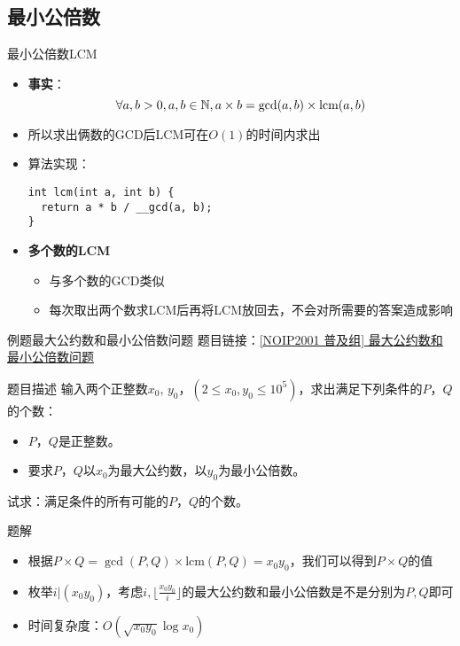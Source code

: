 \subsection{最小公倍数}
\begin{frame}[fragile]{最小公倍数}{LCM}
  \begin{itemize}
    \item \textbf{事实}：
    $$\forall a,b>0,a,b\in \mathbb{N}, a\times b=\gcd(a,b)\times \text{lcm}(a,b)$$
    \item 所以求出俩数的GCD后LCM可在$O(1)$的时间内求出
    \pause
    \item 算法实现：
    \begin{lstlisting}
int lcm(int a, int b) {
  return a * b / __gcd(a, b);
}
    \end{lstlisting}
    \pause
    \item \textbf{多个数的LCM}
    \begin{itemize}
      \item 与多个数的GCD类似
      \pause
      \item 每次取出两个数求LCM后再将LCM放回去，不会对所需要的答案造成影响
    \end{itemize}
  \end{itemize}
\end{frame}

\begin{frame}{例题}{最大公约数和最小公倍数问题}
  题目链接：\href{https://www.luogu.com.cn/problem/P1029}{[NOIP2001 普及组] 最大公约数和最小公倍数问题}
  \begin{block}{题目描述}
    输入两个正整数$x_0$, $y_0$，$(2\leq x_0,y_0\leq 10^5)$，求出满足下列条件的$P$，$Q$的个数：
    \begin{itemize}
      \item $P$，$Q$是正整数。
      \item 要求$P$，$Q$以$x_0$为最大公约数，以$y_0$为最小公倍数。
    \end{itemize}
    试求：满足条件的所有可能的$P$，$Q$的个数。
  \end{block}
  \vspace{0.3cm}
  \pause
  \begin{exampleblock}{题解}
    \begin{itemize}
      \item 根据$P\times Q=\gcd(P,Q)\times \text{lcm}(P,Q)=x_0y_0$，我们可以得到$P\times Q$的值
      \item 枚举$i|(x_0y_0)$，考虑$i,\lfloor \frac{x_0y_0}{i} \rfloor$的最大公约数和最小公倍数是不是分别为$P,Q$即可
      \pause
      \item 时间复杂度：$O(\sqrt{x_0y_0}\log{x_0})$
    \end{itemize}
  \end{exampleblock}
\end{frame}

